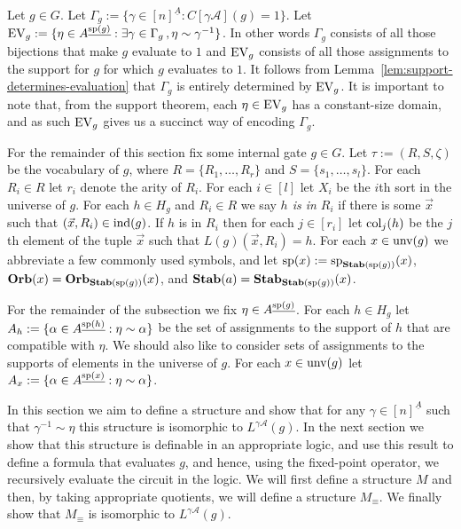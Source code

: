 \documentclass[../main/thesis.tex]{subfiles}
\begin{document}
Let $g \in G$. Let $\Gamma_g:= \{\gamma \in [n]^{\underline{A}} : C[\gamma
\mathcal{A}](g) = 1 \}$. Let $\text{EV}_g := \{ \eta \in A^{\underline{\text{sp}(g)}} :
\exists \gamma \in \Gamma_g \, ,\eta \sim \gamma^{-1}\}$. In other words
$\Gamma_g$ consists of all those bijections that make $g$ evaluate to $1$ and
$\text{EV}_g$ consists of all those assignments to the support for $g$ for which $g$
evaluates to $1$. It follows from Lemma~\ref{lem:support-determines-evaluation}
that $\Gamma_g$ is entirely determined by $\text{EV}_g$. It is important to note that,
from the support theorem, each $\eta \in \text{EV}_g$ has a constant-size domain, and
as such $\text{EV}_g$ gives us a succinct way of encoding $\Gamma_g$.

For the remainder of this section fix some internal gate $g \in G$. Let $\tau :=
(R, S, \zeta)$ be the vocabulary of $g$, where $R = \{R_1, \ldots, R_r\}$ and $S
= \{s_1, \ldots, s_l\}$. For each $R_i \in R$ let $r_i$ denote the arity of
$R_i$. For each $i \in [l]$ let $X_i$ be the $i$th sort in the universe of $g$.
For each $h \in H_g$ and $R_i \in R$ we say \emph{$h$ is in $R_i$} if there is
some $\vec{x}$ such that $(\vec{x}, R_i) \in \text{\upshape ind}(g)$. If $h$ is in $R_i$ then
for each $j \in [r_i]$ let $\text{\upshape col}_{j}(h)$ be the $j$th element of the tuple
$\vec{x}$ such that $L(g)(\vec{x}, R_i) = h$. For each $x \in \text{unv}(g)$ we
abbreviate a few commonly used symbols, and let $\text{sp}(x) :=
\text{sp}_{\text{\textbf{Stab}} (\text{sp} (g))}(x)$, $\text{\textbf{Orb}}(x) = \text{\textbf{Orb}}_{\text{\textbf{Stab}} (\text{sp} (g))}(x)$, and $\text{\textbf{Stab}}(a) =
\text{\textbf{Stab}}_{\text{\textbf{Stab}} (\text{sp} (g))}(x)$.

For the remainder of the subsection we fix $\eta \in A^{\underline{\text{sp}(g)}}$.
For each $h \in H_g$ let $A_h := \{\alpha \in A^{\underline{\text{sp}(h)}} : \eta
\sim \alpha\}$ be the set of assignments to the support of $h$ that are
compatible with $\eta$. We should also like to consider sets of assignments to
the supports of elements in the universe of $g$. For each $x \in \text{unv}(g)$
let $A_x:= \{\alpha \in A^{\underline{\text{sp}(x)}} : \eta \sim \alpha\}$.

In this section we aim to define a structure and show that for any $\gamma \in
[n]^{\underline{A}}$ such that $\gamma^{-1} \sim \eta$ this structure is
isomorphic to $L^{\gamma \mathcal{A}}(g)$. In the next section we show that this
structure is definable in an appropriate logic, and use this result to define a
formula that evaluates $g$, and hence, using the fixed-point operator, we
recursively evaluate the circuit in the logic. We will first define a structure
$M$ and then, by taking appropriate quotients, we will define a structure
$M_\equiv$. We finally show that $M_{\equiv}$ is isomorphic to $L^{\gamma
  \mathcal{A}}(g)$.
\end{document}
